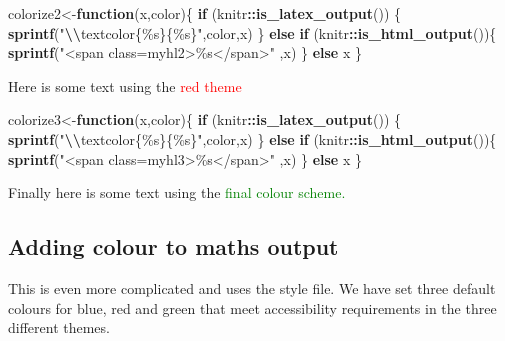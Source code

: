 \documentclass[
]{article}
\newenvironment{Shaded}{\begin{snugshade}}{\end{snugshade}}
\newcommand{\ControlFlowTok}[1]{\textcolor[rgb]{0.13,0.29,0.53}{\textbf{#1}}}
\newcommand{\FunctionTok}[1]{\textcolor[rgb]{0.13,0.29,0.53}{\textbf{#1}}}
\newcommand{\NormalTok}[1]{#1}
\newcommand{\OtherTok}[1]{\textcolor[rgb]{0.56,0.35,0.01}{#1}}
\newcommand{\SpecialCharTok}[1]{\textcolor[rgb]{0.81,0.36,0.00}{\textbf{#1}}}
\newcommand{\StringTok}[1]{\textcolor[rgb]{0.31,0.60,0.02}{#1}}
\numberwithin{equation}{section}
\numberwithin{figure}{section}
\theoremstyle{break}
\theoremstyle{definition}
\theoremstyle{definition}
\theoremstyle{definition}
\theoremstyle{definition}
\theoremstyle{remark}
\begin{document}
\begin{Shaded}
\begin{Highlighting}[]
\NormalTok{colorize2}\OtherTok{\textless{}{-}}\ControlFlowTok{function}\NormalTok{(x,color)\{}
  \ControlFlowTok{if}\NormalTok{ (knitr}\SpecialCharTok{::}\FunctionTok{is\_latex\_output}\NormalTok{()) \{}
    \FunctionTok{sprintf}\NormalTok{(}\StringTok{"}\SpecialCharTok{\textbackslash{}\textbackslash{}}\StringTok{textcolor\{\%s\}\{\%s\}"}\NormalTok{,color,x)}
\NormalTok{  \} }\ControlFlowTok{else} \ControlFlowTok{if}\NormalTok{ (knitr}\SpecialCharTok{::}\FunctionTok{is\_html\_output}\NormalTok{())\{}
    \FunctionTok{sprintf}\NormalTok{(}\StringTok{"\textless{}span class=\textquotesingle{}myhl2\textquotesingle{}\textgreater{}\%s\textless{}/span\textgreater{}"}\NormalTok{ ,x)}
\NormalTok{  \} }\ControlFlowTok{else}\NormalTok{ x}
\NormalTok{\}}
\end{Highlighting}
\end{Shaded}

Here is some text using the \textcolor{red}{red theme}

\begin{Shaded}
\begin{Highlighting}[]
\NormalTok{colorize3}\OtherTok{\textless{}{-}}\ControlFlowTok{function}\NormalTok{(x,color)\{}
  \ControlFlowTok{if}\NormalTok{ (knitr}\SpecialCharTok{::}\FunctionTok{is\_latex\_output}\NormalTok{()) \{}
    \FunctionTok{sprintf}\NormalTok{(}\StringTok{"}\SpecialCharTok{\textbackslash{}\textbackslash{}}\StringTok{textcolor\{\%s\}\{\%s\}"}\NormalTok{,color,x)}
\NormalTok{  \} }\ControlFlowTok{else} \ControlFlowTok{if}\NormalTok{ (knitr}\SpecialCharTok{::}\FunctionTok{is\_html\_output}\NormalTok{())\{}
    \FunctionTok{sprintf}\NormalTok{(}\StringTok{"\textless{}span class=\textquotesingle{}myhl3\textquotesingle{}\textgreater{}\%s\textless{}/span\textgreater{}"}\NormalTok{ ,x)}
\NormalTok{  \} }\ControlFlowTok{else}\NormalTok{ x}
\NormalTok{\}}
\end{Highlighting}
\end{Shaded}

Finally here is some text using the \textcolor{green}{final colour scheme.}

\hypertarget{adding-colour-to-maths-output}{%
\subsection{Adding colour to maths output}\label{adding-colour-to-maths-output}}

This is even more complicated and uses the style file. We have set three default colours for blue, red and green that meet accessibility requirements in the three different themes.
\end{document}
